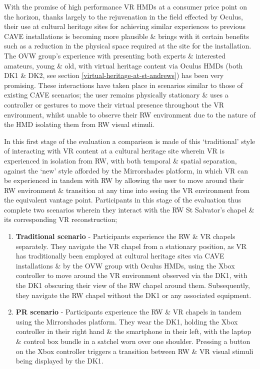 With the promise of high performance VR HMDs at a consumer price point on the horizon, thanks largely to the rejuvenation in the field effected by Oculus, their use at cultural heritage sites for achieving similar experiences to previous CAVE installations is becoming more plausible \& brings with it certain benefits such as a reduction in the physical space required at the site for the installation. The OVW group's experience with presenting both experts \& interested amateurs, young \& old, with virtual heritage content via Oculus HMDs (both DK1 \& DK2, see section \ref{virtual-heritage-at-st-andrews}) has been very promising. These interactions have taken place in scenarios similar to those of existing CAVE scenarios; the user remains physically stationary \& uses a controller or gestures to move their virtual presence throughout the VR environment, whilst unable to observe their RW environment due to the nature of the HMD isolating them from RW visual stimuli.

In this first stage of the evaluation a comparison is made of this `traditional' style of interacting with VR content at a cultural heritage site wherein VR is experienced in isolation from RW, with both temporal \& spatial separation, against the `new' style afforded by the Mirrorshades platform, in which VR can be experienced in tandem with RW by allowing the user to move around their RW environment \& transition at any time into seeing the VR environment from the equivalent vantage point. Participants in this stage of the evaluation thus complete two scenarios wherein they interact with the RW St Salvator's chapel \& its corresponding VR reconstruction;

\begin{enumerate}
	\item \textbf{Traditional scenario} - Participants experience the RW \& VR chapels separately. They navigate the VR chapel from a stationary position, as VR has traditionally been employed at cultural heritage sites via CAVE installations \& by the OVW group with Oculus HMDs, using the Xbox controller to move around the VR environment observed via the DK1, with the DK1 obscuring their view of the RW chapel around them. Subsequently, they navigate the RW chapel without the DK1 or any associated equipment.
	\item \textbf{PR scenario} - Participants experience the RW \& VR chapels in tandem using the Mirrorshades platform. They wear the DK1, holding the Xbox controller in their right hand \& the smartphone in their left, with the laptop \& control box bundle in a satchel worn over one shoulder. Pressing a button on the Xbox controller triggers a transition between RW \& VR visual stimuli being displayed by the DK1.
\end{enumerate}

